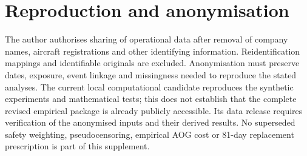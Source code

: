 \section{Reproduction and anonymisation}

The author authorises sharing of operational data after removal of company names, aircraft registrations and other identifying information. Reidentification mappings and identifiable originals are excluded. Anonymisation must preserve dates, exposure, event linkage and missingness needed to reproduce the stated analyses. The current local computational candidate reproduces the synthetic experiments and mathematical tests; this does not establish that the complete revised empirical package is already publicly accessible. Its data release requires verification of the anonymised inputs and their derived results. No superseded safety weighting, pseudocensoring, empirical AOG cost or 81-day replacement prescription is part of this supplement.

